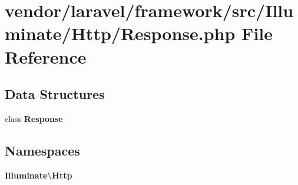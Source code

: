 \section{vendor/laravel/framework/src/\+Illuminate/\+Http/\+Response.php File Reference}
\label{laravel_2framework_2src_2_illuminate_2_http_2_response_8php}
\subsection*{Data Structures}
\begin{DoxyCompactItemize}
\item 
class {\bf Response}
\end{DoxyCompactItemize}
\subsection*{Namespaces}
\begin{DoxyCompactItemize}
\item 
 {\bf Illuminate\textbackslash{}\+Http}
\end{DoxyCompactItemize}
